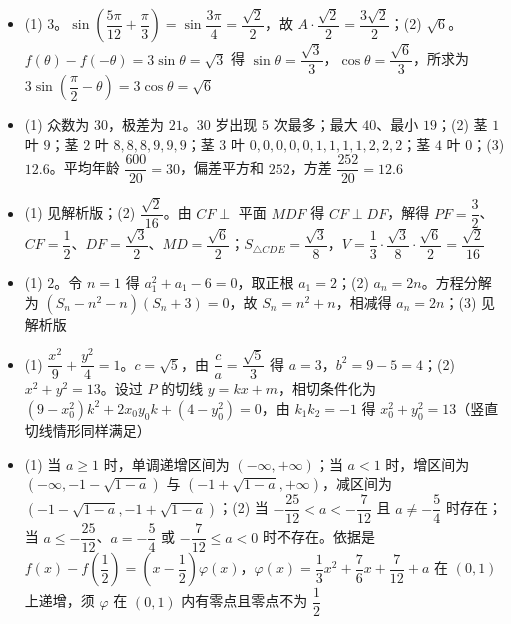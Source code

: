 \begin{itemize}[leftmargin=2.6em]
  \item[\textbf{16.}] (1) $3$。$\sin\left(\dfrac{5\pi}{12}+\dfrac\pi3\right)=\sin\dfrac{3\pi}4=\dfrac{\sqrt2}{2}$，故 $A\cdot\dfrac{\sqrt2}{2}=\dfrac{3\sqrt2}{2}$；(2) $\sqrt6$。$f(\theta)-f(-\theta)=3\sin\theta=\sqrt3$ 得 $\sin\theta=\dfrac{\sqrt3}{3}$，$\cos\theta=\dfrac{\sqrt6}{3}$，所求为 $3\sin\left(\dfrac\pi2-\theta\right)=3\cos\theta=\sqrt6$
  \item[\textbf{17.}] (1) 众数为 $30$，极差为 $21$。$30$ 岁出现 $5$ 次最多；最大 $40$、最小 $19$；(2) 茎 $1$ 叶 $9$；茎 $2$ 叶 $8,8,8,9,9,9$；茎 $3$ 叶 $0,0,0,0,0,1,1,1,1,2,2,2$；茎 $4$ 叶 $0$；(3) $12.6$。平均年龄 $\dfrac{600}{20}=30$，偏差平方和 $252$，方差 $\dfrac{252}{20}=12.6$
  \item[\textbf{18.}] (1) 见解析版；(2) $\dfrac{\sqrt2}{16}$。由 $CF\perp$ 平面 $MDF$ 得 $CF\perp DF$，解得 $PF=\dfrac32$、$CF=\dfrac12$、$DF=\dfrac{\sqrt3}{2}$、$MD=\dfrac{\sqrt6}{2}$；$S_{\triangle CDE}=\dfrac{\sqrt3}{8}$，$V=\dfrac13\cdot\dfrac{\sqrt3}{8}\cdot\dfrac{\sqrt6}{2}=\dfrac{\sqrt2}{16}$
  \item[\textbf{19.}] (1) $2$。令 $n=1$ 得 $a_1^2+a_1-6=0$，取正根 $a_1=2$；(2) $a_n=2n$。方程分解为 $(S_n-n^2-n)(S_n+3)=0$，故 $S_n=n^2+n$，相减得 $a_n=2n$；(3) 见解析版
  \item[\textbf{20.}] (1) $\dfrac{x^2}{9}+\dfrac{y^2}{4}=1$。$c=\sqrt5$，由 $\dfrac ca=\dfrac{\sqrt5}{3}$ 得 $a=3$，$b^2=9-5=4$；(2) $x^2+y^2=13$。设过 $P$ 的切线 $y=kx+m$，相切条件化为 $(9-x_0^2)k^2+2x_0y_0k+(4-y_0^2)=0$，由 $k_1k_2=-1$ 得 $x_0^2+y_0^2=13$（竖直切线情形同样满足）
  \item[\textbf{21.}] (1) 当 $a\geqslant1$ 时，单调递增区间为 $(-\infty,+\infty)$；当 $a<1$ 时，增区间为 $(-\infty,-1-\sqrt{1-a})$ 与 $(-1+\sqrt{1-a},+\infty)$，减区间为 $(-1-\sqrt{1-a},-1+\sqrt{1-a})$；(2) 当 $-\dfrac{25}{12}<a<-\dfrac{7}{12}$ 且 $a\neq-\dfrac54$ 时存在；当 $a\leqslant-\dfrac{25}{12}$、$a=-\dfrac54$ 或 $-\dfrac{7}{12}\leqslant a<0$ 时不存在。依据是 $f(x)-f\left(\dfrac12\right)=\left(x-\dfrac12\right)\varphi(x)$，$\varphi(x)=\dfrac13x^2+\dfrac76x+\dfrac7{12}+a$ 在 $(0,1)$ 上递增，须 $\varphi$ 在 $(0,1)$ 内有零点且零点不为 $\dfrac12$
\end{itemize}
